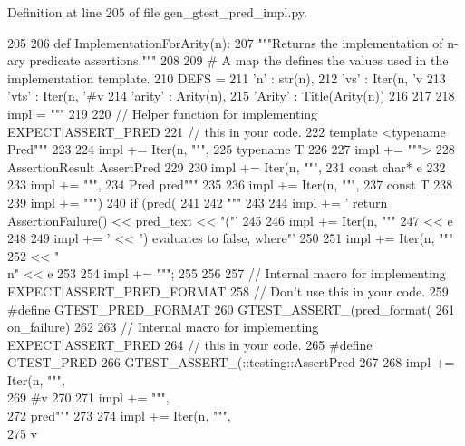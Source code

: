 \-Definition at line 205 of file gen\-\_\-gtest\-\_\-pred\-\_\-impl.\-py.


\begin{DoxyCode}
205 
206 def ImplementationForArity(n):
207   """Returns the implementation of n-ary predicate assertions."""
208 
209   # A map the defines the values used in the implementation template.
210   DEFS = {
211     'n' : str(n),
212     'vs' : Iter(n, 'v%
213     'vts' : Iter(n, '#v%
214     'arity' : Arity(n),
215     'Arity' : Title(Arity(n))
216     }
217 
218   impl = """
219 
220 // Helper function for implementing {EXPECT|ASSERT}_PRED%
221 // this in your code.
222 template <typename Pred""" %
223 
224   impl += Iter(n, """,
225           typename T%
226 
227   impl += """>
228 AssertionResult AssertPred%
229 
230   impl += Iter(n, """,
231                                   const char* e%
232 
233   impl += """,
234                                   Pred pred"""
235 
236   impl += Iter(n, """,
237                                   const T%
238 
239   impl += """) {
240   if (pred(%
241 
242 """ %
243 
244   impl += '  return AssertionFailure() << pred_text << "("'
245 
246   impl += Iter(n, """
247                             << e%
248 
249   impl += ' << ") evaluates to false, where"'
250 
251   impl += Iter(n, """
252                             << "\\n" << e%
253 
254   impl += """;
255 }
256 
257 // Internal macro for implementing {EXPECT|ASSERT}_PRED_FORMAT%
258 // Don't use this in your code.
259 #define GTEST_PRED_FORMAT%
260   GTEST_ASSERT_(pred_format(%
261                 on_failure)
262 
263 // Internal macro for implementing {EXPECT|ASSERT}_PRED%
264 // this in your code.
265 #define GTEST_PRED%
266   GTEST_ASSERT_(::testing::AssertPred%
267 
268   impl += Iter(n, """, \\
269                                              #v%
270 
271   impl += """, \\
272                                              pred"""
273 
274   impl += Iter(n, """, \\
275                                              v%

\end{DoxyCode}
